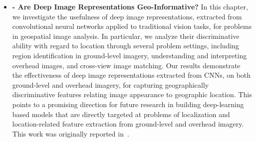\begin{itemize}[noitemsep]

  \item \textbf{ - Are Deep Image Representations
    Geo-Informative?} \newline \newline In this chapter, we
    investigate the usefulness of deep image representations,
    extracted from convolutional neural networks applied to
    traditional vision tasks, for problems in geospatial image
    analysis. In particular, we analyze their discriminative ability
    with regard to location through several problem settings,
    including region identification in ground-level imagery,
    understanding and interpreting overhead images, and cross-view
    image matching.  Our results demonstrate the effectiveness of deep
    image representations extracted from CNNs, on both ground-level
    and overhead imagery, for capturing geographically discriminative
    features relating image appearance to geographic location.  This
    points to a promising direction for future research in building
    deep-learning based models that are directly targeted at problems
    of localization and location-related feature extraction from
    ground-level and overhead imagery.  This work was originally
    reported in~\cite{workman2015geocnn}. \newline

\end{itemize}
